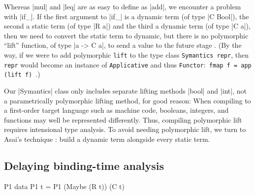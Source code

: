\fi
Whereas |mul| and |leq| are as easy to define as |add|, we encounter
a problem with |if_|.  If the first argument to |if_| is a dynamic term
(of type |C Bool|), the second a static term (of type |R a|) and the third a
dynamic term (of type |C a|), then we need to convert
the static term to dynamic, but there is no polymorphic ``lift''
function, of type |a -> C a|, to send a value to the future stage
\citep{xi-guarded,WalidPOPL03}.\ifshort\else
(By the way, if we
were to add polymorphic \texttt{lift} to the type class
\texttt{Symantics repr}, then \texttt{repr} would become an instance of
\texttt{Applicative} and thus \texttt{Functor}:\texttt{ fmap
f = app (lift f)~}.)\fi

Our |Symantics| class only includes separate lifting methods |bool| and
|int|, not a parametrically polymorphic lifting method, for good reason:
When compiling to a first-order target language such as machine code,
booleans, integers, and functions may well be represented differently.
Thus, compiling polymorphic lift requires intensional type
analysis.  To avoid needing polymorphic lift, we turn to
Asai's technique \citep{asai-binding-time,sumii-hybrid}:
build a dynamic term
alongside every static term.

\subsection{Delaying binding-time analysis}
\label{S:PE-problem}

\begin{SaveVerbatim}{P1}
data P1 t = P1 (Maybe (R t)) (C t)
\end{SaveVerbatim}

